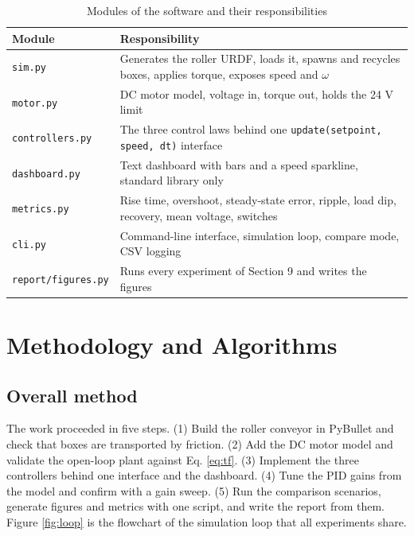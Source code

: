 \documentclass[12pt,a4paper]{article}
\begin{document}
\begin{table}[htbp]
\centering
\caption{Modules of the software and their responsibilities}
\label{tab:modules}
\begin{tabular}{|l|p{9.2cm}|}
\hline
\textbf{Module} & \textbf{Responsibility} \\ \hline
\texttt{sim.py} & Generates the roller URDF, loads it, spawns and recycles boxes, applies torque, exposes speed and $\omega$ \\ \hline
\texttt{motor.py} & DC motor model, voltage in, torque out, holds the 24 V limit \\ \hline
\texttt{controllers.py} & The three control laws behind one \texttt{update(setpoint, speed, dt)} interface \\ \hline
\texttt{dashboard.py} & Text dashboard with bars and a speed sparkline, standard library only \\ \hline
\texttt{metrics.py} & Rise time, overshoot, steady-state error, ripple, load dip, recovery, mean voltage, switches \\ \hline
\texttt{cli.py} & Command-line interface, simulation loop, compare mode, CSV logging \\ \hline
\texttt{report/figures.py} & Runs every experiment of Section 9 and writes the figures \\ \hline
\end{tabular}
\end{table}

\section{Methodology and Algorithms}

\subsection{Overall method}

The work proceeded in five steps. (1) Build the roller conveyor in PyBullet and check that boxes are transported by friction. (2) Add the DC motor model and validate the open-loop plant against Eq. \ref{eq:tf}. (3) Implement the three controllers behind one interface and the dashboard. (4) Tune the PID gains from the model and confirm with a gain sweep. (5) Run the comparison scenarios, generate figures and metrics with one script, and write the report from them. Figure \ref{fig:loop} is the flowchart of the simulation loop that all experiments share.
\end{document}
